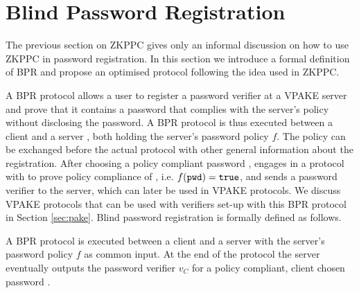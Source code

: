 \section{Blind Password Registration} \label{sec:bpr}

The previous section on \ac{ZKPPC} gives only an informal discussion on how to use \ac{ZKPPC} in password registration.
In this section we introduce a formal definition of \ac{BPR} and propose an optimised protocol following the idea used in \ac{ZKPPC}.

A \ac{BPR} protocol allows a user to register a password verifier at a \ac{VPAKE} server and prove that it contains a password that complies with the server's policy without disclosing the password.
A \ac{BPR} protocol is thus executed between a client \Client and a server \Server, both holding the server's password policy $f$.
The policy can be exchanged before the actual protocol with other general information about the registration.
After choosing a policy compliant password \pwd, \Client engages in a protocol with \Server to prove policy compliance of \pwd, i.e. $f(\mathtt{pwd})=\mathtt{true}$, and sends a password verifier to the server, which can later be used in \ac{VPAKE} protocols.
We discuss \ac{VPAKE} protocols that can be used with verifiers set-up with this \ac{BPR} protocol in Section \ref{sec:pake}.
Blind password registration is formally defined as follows.

\begin{definition}\label{def:bpr}
A \ac{BPR} protocol is executed between a client \Client and a server \Server with the server's password policy $f$ as common input. 
At the end of the protocol the server eventually outputs the password verifier $v_C$ for a policy compliant, client chosen password \pwd. %
\eod
\end{definition}

